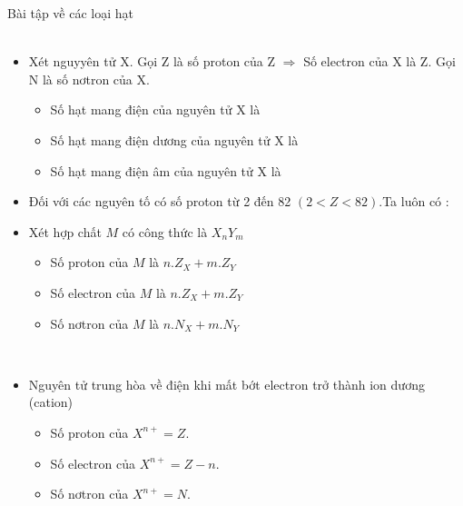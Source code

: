 \newpage
\begin{dangntd}{Bài tập về các loại hạt}
	\\
	\\
	\begin{itemize}
		\item	Xét nguyyên tử X. Gọi Z là số proton của Z
		$ \Rightarrow $ Số electron của X là Z.
		Gọi N  là số nơtron của X.
		\begin{itemize}
			\item Số hạt mang điện của nguyên tử X là 
			\item Số hạt mang điện dương của nguyên tử X là 
			\item Số hạt mang điện âm của nguyên tử X là 
		\end{itemize}
		\item Đối với các nguyên tố có số proton từ 2 đến 82 $ (2<Z<82) $.Ta luôn có : 
		\item Xét hợp chất $ M $ có công thức là $ X_{n}Y_{m} $
		\begin{itemize}
			\item Số proton của $ M $ là $ n.Z_{X} + m.Z_{Y} $
			\item Số electron của $ M $ là $ n.Z_{X} + m.Z_{Y} $
			\item Số nơtron của $ M $ là $ n.N_{X} + m.N_{Y} $
		\end{itemize}
	\end{itemize}
	\\
	\begin{itemize}
		\item Nguyên tử trung hòa về điện khi  mất bớt electron trở thành ion dương (cation)
		\begin{center}
		\end{center}
		\begin{itemize}
			\item Số proton của $ X^{n+} = Z $.
			\item Số electron của $ X^{n+} = Z-n $.
			\item Số nơtron của $ X^{n+} = N $.
		\end{itemize}
		

\end{itemize}
\end{dangntd}
